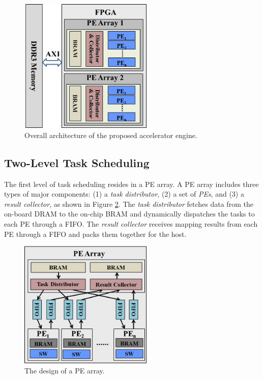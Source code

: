 \begin{figure}[!hbt]
\begin{center}
\includegraphics[width=2.5in]{Figures/Figure_Arch1.jpg}
\caption {Overall architecture of the proposed accelerator engine.} \label{fig:overall_architecture} \end{center} \end{figure}
\vspace{-10pt}

\subsection{Two-Level Task Scheduling}

The first level of task scheduling resides in a PE array. 
A PE array includes three types of major components: (1) a \textit{task distributor}, (2) a set of \textit{PEs}, and (3) a \textit{result collector}, 
as shown in Figure \ref{fig:schedule_structure}.
The \textit{task distributor} fetches data from the on-board DRAM to the on-chip BRAM and dynamically dispatches the tasks to each PE through a FIFO.
The \textit{result collector} receives mapping results from each PE through a FIFO and packs them together for the host.

\begin{figure}[!hbt]
\begin{center}
\includegraphics[width=2.5in]{Figures/Figure_Arch2.jpg}
\caption {The design of a PE array.} \label{fig:schedule_structure} \end{center} \end{figure}
\vspace{-10pt}



